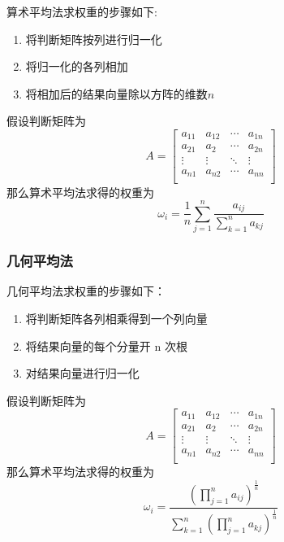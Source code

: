 \documentclass[withoutpreface]{cumcmthesis}
\begin{document}
    算术平均法求权重的步骤如下:

    \begin{enumerate}
        \item 将判断矩阵按列进行归一化
        \item 将归一化的各列相加
        \item 将相加后的结果向量除以方阵的维数$n$
    \end{enumerate}

    假设判断矩阵为$$A=\begin{bmatrix}
        a_{11} & a_{12} & \cdots & a_{1n} \\
        a_{21} & a_{2} & \cdots & a_{2n} \\
        \vdots & \vdots & \ddots & \vdots \\
        a_{n1} & a_{n2} & \cdots & a_{nn} \\ 
    \end{bmatrix}$$
    那么算术平均法求得的权重为
    \begin{equation}
        \omega_i = \frac{1}{n} \sum\limits_{j=1}^{n} \frac{a_{ij}}{\sum\limits_{k=1}^{n}a_{kj}}
    \end{equation}

    \subsubsection{几何平均法}

    几何平均法求权重的步骤如下：
    \begin{enumerate}
        \item 将判断矩阵各列相乘得到一个列向量
        \item 将结果向量的每个分量开 n 次根
        \item 对结果向量进行归一化
    \end{enumerate}

    假设判断矩阵为$$A=\begin{bmatrix}
        a_{11} & a_{12} & \cdots & a_{1n} \\
        a_{21} & a_{2} & \cdots & a_{2n} \\
        \vdots & \vdots & \ddots & \vdots \\
        a_{n1} & a_{n2} & \cdots & a_{nn} \\ 
    \end{bmatrix}$$
    那么算术平均法求得的权重为
    \begin{equation}
        \omega_i = \frac{(\prod \limits_{j=1}^n a_{ij})^{\frac{1}{n}}}{\sum\limits_{k=1}^{n} (\prod \limits_{j=1}^n a_{kj})^{\frac{1}{n}}}
    \end{equation}
\end{document}

